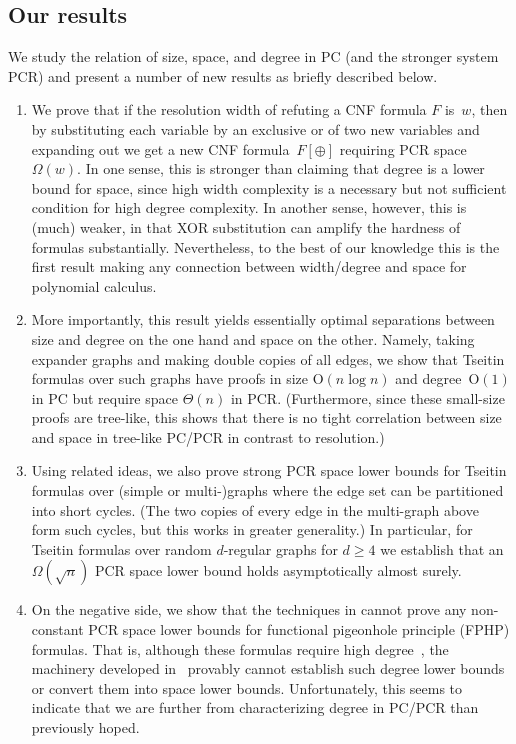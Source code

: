 \documentclass[11pt]{article}
\numberwithin{equation}{section}
\theoremstyle{definition}
\theoremstyle{plain}
\theoremstyle{plain}
\theoremstyle{definition}
\newcommand{\bigoh}[1]{\mathrm{O} ( #1 )}
\newcommand{\bigtheta}[1]{\Theta ( #1 )}
\newcommand{\bigomega}[1]{\Omega ( #1 )}
\newcommand{\substform}[2]{{#1}[{#2}]}
\newcommand{\xor}{\oplus}
\newcommand{\mysubsection}[1]{\subsection{#1}}
\begin{document}
\mysubsection{Our results}
\label{sec:intro-our-results}

We study the relation of size, space, and degree in PC (and the 
stronger system PCR) and present
a number of new results as 
briefly described below.
%
\begin{enumerate}
  \item We prove that if the resolution width of refuting a CNF
  formula $F$ is~$w$, then by substituting each variable by an
  exclusive or of two new variables and expanding out we get a new CNF
  formula~$\substform{F}{\xor}$ requiring PCR space $\bigomega{w}$.
  In one sense, this is stronger than claiming that degree is a lower
  bound for space, since high width complexity is a necessary but not
  sufficient condition for high degree complexity. In another sense,
  however, this is (much) weaker, in that XOR substitution can amplify
  the hardness of formulas substantially. Nevertheless, to the best of
  our knowledge this is the first result making any connection between
  width/degree and space for polynomial calculus.%

\item
  More importantly, this result yields essentially optimal
  separations between size and degree on the one hand and space on
  the other. Namely, taking expander graphs and making
  double copies of all edges, we show that Tseitin formulas
  over such graphs
  have proofs in size $\bigoh{n \log n }$ and
  \mbox{degree $\bigoh{1}$} in PC but require
  space $\bigtheta{n}$ in PCR.
  (Furthermore, since these small-size proofs are tree-like, this
  shows that there is no tight correlation between size and space in
  tree-like PC/PCR in contrast to
  resolution.)

\item
  Using related ideas, we also prove strong PCR space
  lower bounds for Tseitin formulas over 
  (simple or \mbox{multi-)graphs}
%
  where the edge set can be partitioned into %
  short  %
  cycles.
  (The two copies of every edge in the multi-graph above form such
  cycles, but this works in greater generality.)
  In particular, for Tseitin formulas over random $d$-regular graphs
  for $d \geq 4$ we establish that \mbox{an $\bigomega{\sqrt{n}}$} PCR
  space lower bound holds asymptotically almost surely.%

\item
  On the negative side, we show that the
  techniques in
  \cite{BG15Framework}
  cannot prove any non-constant PCR space lower bounds for
  functional pigeonhole principle (FPHP) formulas.
  That is, although these formulas require high 
  degree~\cite{MN15GeneralizedMethodDegree},
  the machinery developed in~\cite{BG15Framework}
  provably cannot establish such degree lower bounds or convert them
  into space lower bounds.
  Unfortunately, this seems to indicate that we are further from
  characterizing degree in PC/PCR than previously hoped.
\end{enumerate}
\end{document}
